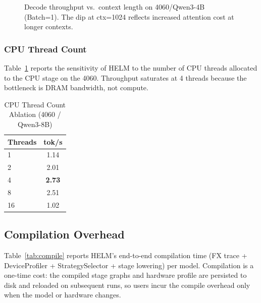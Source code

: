 \documentclass[lettersize,journal]{IEEEtran}
\begin{document}
\begin{figure}[!t]
\centering
{}
\caption{Decode throughput vs.\ context length on 4060/Qwen3-4B (Batch=1).
The dip at ctx=1024 reflects increased attention cost at longer contexts.}
\label{fig:ctx}
\end{figure}

\subsubsection{CPU Thread Count}
Table~\ref{tab:ablation_threads} reports the sensitivity of HELM to the
number of CPU threads allocated to the CPU stage on the 4060. Throughput
saturates at 4 threads because the bottleneck is DRAM
bandwidth, not compute.

\begin{table}[!t]
\caption{CPU Thread Count Ablation (4060 / Qwen3-8B)}
\label{tab:ablation_threads}
\centering
\small
\begin{tabular}{lc}
\toprule
\textbf{Threads} & \textbf{tok/s} \\
\midrule
1  & 1.14 \\
2  & 2.01 \\
4  & \textbf{2.73} \\
8  & 2.51 \\
16 & 1.02 \\
\bottomrule
\end{tabular}
\end{table}

\subsection{Compilation Overhead}
\label{sec:compile_overhead}

Table~\ref{tab:compile} reports HELM's end-to-end compilation time (FX
trace + DeviceProfiler + StrategySelector + stage lowering) per model.
Compilation is a one-time cost: the compiled stage graphs and hardware
profile are persisted to disk and reloaded on subsequent runs, so users
incur the compile overhead only when the model or hardware changes.
\end{document}
